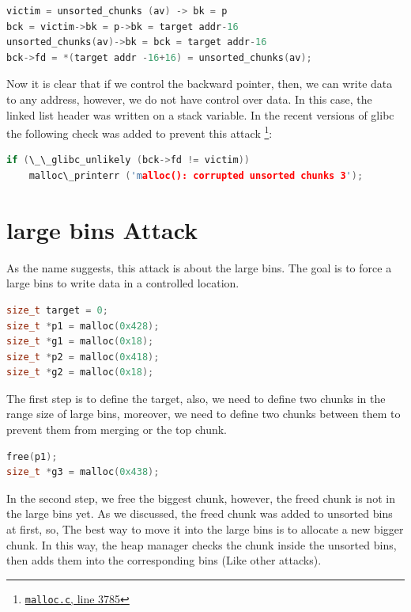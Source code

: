\documentclass{masterthesis}
\newcommand*\libc{glibc}
\newcommand*\ub{unsorted bins}
\newcommand*\lb{large bins}
\begin{document}
\begin{lstlisting}[language=c,frame=tlrb]
victim = unsorted_chunks (av) -> bk = p
bck = victim->bk = p->bk = target addr-16
unsorted_chunks(av)->bk = bck = target addr-16
bck->fd = *(target addr -16+16) = unsorted_chunks(av);
\end{lstlisting}

Now it is clear that if we control the backward pointer, then, we can write data to any address, however, we do not have control over data. In this case, the linked list header was written on a stack variable. In the recent versions of \libc{} the following check was added to prevent this attack \footnote{\href{https://sourceware.org/git/?p=glibc.git;a=blob;f=malloc/malloc.c;h=f7cd29bc2f93e1082ee77800bd64a4b2a2897055;hb=9ea3686266dca3f004ba874745a4087a89682617\#l3785}{\texttt{malloc.c}, line 3785}}:

\begin{lstlisting}[language=c,frame=tlrb]
if (\_\_glibc_unlikely (bck->fd != victim))
	malloc\_printerr ('malloc(): corrupted unsorted chunks 3');
\end{lstlisting}

\section{\lb{} Attack}

As the name suggests, this attack is about the \lb{}. The goal is to force a \lb{} to write data in a controlled location.

\begin{lstlisting}[language=c,frame=tlrb]
size_t target = 0;
size_t *p1 = malloc(0x428);
size_t *g1 = malloc(0x18);
size_t *p2 = malloc(0x418);
size_t *g2 = malloc(0x18);
\end{lstlisting}

The first step is to define the target, also, we need to define two chunks in the range size of \lb{}, moreover, we need to define two chunks between them to prevent them from merging or the top chunk. 

\begin{lstlisting}[language=c,frame=tlrb]
free(p1);
size_t *g3 = malloc(0x438);
\end{lstlisting}

In the second step, we free the biggest chunk, however, the freed chunk is not in the \lb{} yet. As we discussed, the freed chunk was added to \ub{} at first, so, The best way to move it into the \lb{} is to allocate a new bigger chunk. In this way, the heap manager checks the chunk inside the \ub{}, then adds them into the corresponding bins (Like other attacks).
\end{document}
